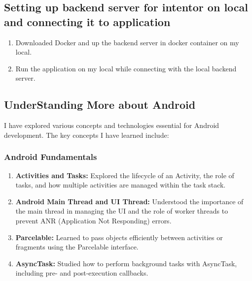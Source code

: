 \documentclass[12pt]{article}
\begin{document}
\begin{itemize}
    \subsection{Setting up backend server for intentor on local and connecting it to application}
    \begin{enumerate}
        \item Downloaded Docker and up the backend server in docker container on my local.
        \item Run the application on my local while connecting with the local backend server.
    \end{enumerate}
    \subsection{UnderStanding More about Android}
     I have explored various concepts and technologies essential for Android development. The key concepts I have learned include:
    
    \subsubsection{Android Fundamentals}
    \begin{enumerate}
    
        \item \textbf{Activities and Tasks:} Explored the lifecycle of an Activity, the role of tasks, and how multiple activities are managed within the task stack.
        \item \textbf{Android Main Thread and UI Thread:} Understood the importance of the main thread in managing the UI and the role of worker threads to prevent ANR (Application Not Responding) errors.
        \item \textbf{Parcelable:} Learned to pass objects efficiently between activities or fragments using the Parcelable interface.
        \item \textbf{AsyncTask:} Studied how to perform background tasks with AsyncTask, including pre- and post-execution callbacks.
    \end{enumerate}
    

\end{itemize}
\end{document}
